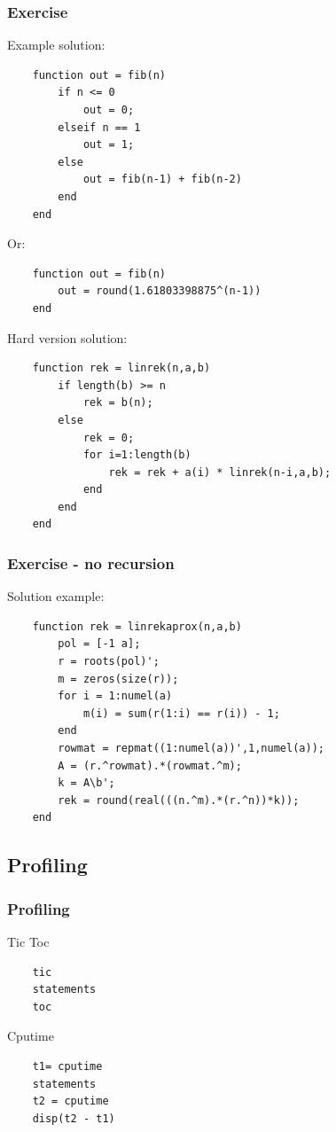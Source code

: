 \documentclass{beamer}
\begin{document}
\begin{frame}[fragile]
\frametitle{Exercise}
    \begin{block}{Example solution:}
  \begin{verbatim}
    function out = fib(n)
        if n <= 0
            out = 0;
        elseif n == 1
            out = 1;
        else
            out = fib(n-1) + fib(n-2)
        end
    end \end{verbatim}
  \end{block}
  \pause  
  \begin{block}{Or:}
  \begin{verbatim}
    function out = fib(n)
        out = round(1.61803398875^(n-1))
    end \end{verbatim}
  \end{block}
\end{frame}  

\begin{frame}[fragile]
    \begin{block}{Hard version solution:}
  \begin{verbatim}
    function rek = linrek(n,a,b)
        if length(b) >= n
            rek = b(n);
        else
            rek = 0;
            for i=1:length(b)
                rek = rek + a(i) * linrek(n-i,a,b);
            end
        end
    end \end{verbatim}
  \end{block}
\end{frame}

\begin{frame}[fragile]
\frametitle{Exercise - no recursion}
  \begin{block}{Solution example:}
  \begin{verbatim}
    function rek = linrekaprox(n,a,b)
        pol = [-1 a];
        r = roots(pol)';
        m = zeros(size(r));
        for i = 1:numel(a)
            m(i) = sum(r(1:i) == r(i)) - 1;
        end
        rowmat = repmat((1:numel(a))',1,numel(a));
        A = (r.^rowmat).*(rowmat.^m);
        k = A\b';
        rek = round(real(((n.^m).*(r.^n))*k));
    end \end{verbatim}
  \end{block}
\end{frame}

\subsection{Profiling}

\begin{frame}[fragile]
\frametitle{Profiling}
  \begin{block}{Tic Toc}
  \begin{verbatim}
    tic
    statements
    toc \end{verbatim}
  \end{block}
  
  \begin{block}{Cputime}
  \begin{verbatim}
    t1= cputime
    statements
    t2 = cputime
    disp(t2 - t1) \end{verbatim}
  \end{block}
\end{frame}
\end{document}
